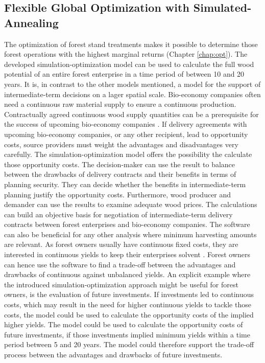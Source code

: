 \subsection{Flexible Global Optimization with Simulated-Annealing}
\label{subsec:discussion:struct:opt}
The optimization of forest stand treatments makes it possible to determine those forest operations with the highest marginal returns (Chapter \ref{chap:opt}). The developed simulation-optimization model can be used to calculate the full wood potential of an entire forest enterprise in a time period of between 10 and 20 years. It is, in contrast to the other models mentioned, a model for the support of intermediate-term decisions on a lager spatial scale. Bio-economy companies often need a continuous raw material supply to ensure a continuous production. Contractually agreed continuous wood supply quantities can be a prerequisite for the success of upcoming bio-economy companies \citep[p. 221, 223]{elchichakli_2016}. If delivery agreements with upcoming bio-economy companies, or any other recipient, lead to opportunity costs, source providers must weight the advantages and disadvantages very carefully. The simulation-optimization model offers the possibility the calculate those opportunity costs. The decision-maker can use the result to balance between the drawbacks of delivery contracts and their benefits in terms of planning security. They can decide whether the benefits in intermediate-term planning justify the opportunity costs. Furthermore, wood producer and demander can use the results to examine adequate wood prices. The calculations can build an objective basis for negotiation of intermediate-term delivery contracts between forest enterprises and bio-economy companies. The software can also be beneficial for any other analysis where minimum harvesting amounts are relevant. As forest owners usually have continuous fixed costs, they are interested in continuous yields to keep their enterprises solvent \citep[p. 74]{mohring_2010b}. Forest owners can hence use the software to find a trade-off between the advantages and drawbacks of continuous against unbalanced yields. An explicit example where the introduced simulation-optimization approach might be useful for forest owners, is the evaluation of future investments. If investments led to continuous costs, which may result in the need for higher continuous yields to tackle those costs, the model could be used to calculate the opportunity costs of the implied higher yields. The model could be used to calculate the opportunity costs of future investments, if those investments implied minimum yields within a time period between 5 and 20 years. The model could therefore support the trade-off process between the advantages and drawbacks of future investments.

